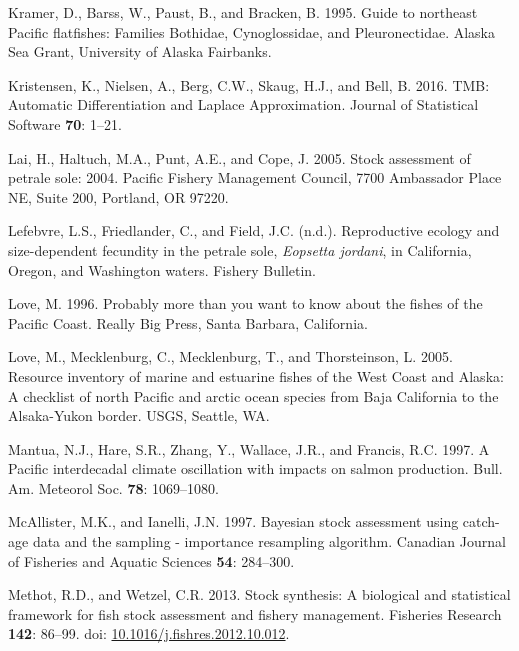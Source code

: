 \documentclass[12pt,]{article}
\begin{document}
\hypertarget{ref-kramer_guide_1995}{}
Kramer, D., Barss, W., Paust, B., and Bracken, B. 1995. Guide to
northeast Pacific flatfishes: Families Bothidae, Cynoglossidae, and
Pleuronectidae. Alaska Sea Grant, University of Alaska Fairbanks.

\hypertarget{ref-kristensen_tmb:_2016}{}
Kristensen, K., Nielsen, A., Berg, C.W., Skaug, H.J., and Bell, B. 2016.
TMB: Automatic Differentiation and Laplace Approximation. Journal of
Statistical Software \textbf{70}: 1--21.

\hypertarget{ref-lai_stock_2005}{}
Lai, H., Haltuch, M.A., Punt, A.E., and Cope, J. 2005. Stock assessment
of petrale sole: 2004. Pacific Fishery Management Council, 7700
Ambassador Place NE, Suite 200, Portland, OR 97220.

\hypertarget{ref-lefebvre_reproductive_nodate}{}
Lefebvre, L.S., Friedlander, C., and Field, J.C. (n.d.). Reproductive
ecology and size-dependent fecundity in the petrale sole, \emph{Eopsetta
jordani}, in California, Oregon, and Washington waters. Fishery
Bulletin.

\hypertarget{ref-love_milton_probably_1996}{}
Love, M. 1996. Probably more than you want to know about the fishes of
the Pacific Coast. Really Big Press, Santa Barbara, California.

\hypertarget{ref-love_milton_resource_2005}{}
Love, M., Mecklenburg, C., Mecklenburg, T., and Thorsteinson, L. 2005.
Resource inventory of marine and estuarine fishes of the West Coast and
Alaska: A checklist of north Pacific and arctic ocean species from Baja
California to the Alsaka-Yukon border. USGS, Seattle, WA.

\hypertarget{ref-mantua_pacific_1997}{}
Mantua, N.J., Hare, S.R., Zhang, Y., Wallace, J.R., and Francis, R.C.
1997. A Pacific interdecadal climate oscillation with impacts on salmon
production. Bull. Am. Meteorol Soc. \textbf{78}: 1069--1080.

\hypertarget{ref-mcallister_bayesian_1997}{}
McAllister, M.K., and Ianelli, J.N. 1997. Bayesian stock assessment
using catch-age data and the sampling - importance resampling algorithm.
Canadian Journal of Fisheries and Aquatic Sciences \textbf{54}:
284--300.

\hypertarget{ref-methot_stock_2013}{}
Methot, R.D., and Wetzel, C.R. 2013. Stock synthesis: A biological and
statistical framework for fish stock assessment and fishery management.
Fisheries Research \textbf{142}: 86--99. doi:
\href{https://doi.org/10.1016/j.fishres.2012.10.012}{10.1016/j.fishres.2012.10.012}.
\end{document}
